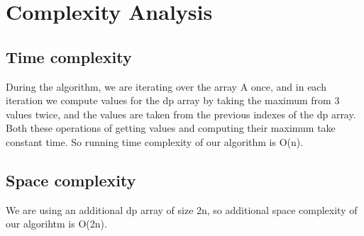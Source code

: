 \documentclass{article}
\begin{document}
\section{Complexity Analysis}
\subsection{Time complexity}
During the algorithm, we are iterating over the array A once, and in each iteration we compute values for the dp array by taking the maximum from 3 values twice, and the values are taken from the previous indexes of the dp array. Both these operations of getting values and computing their maximum take constant time. So running time complexity of our algorithm is O(n).\\
\subsection{Space complexity}
We are using an additional dp array of size 2n, so additional space complexity 
of our algorihtm is O(2n).
\end{document}
